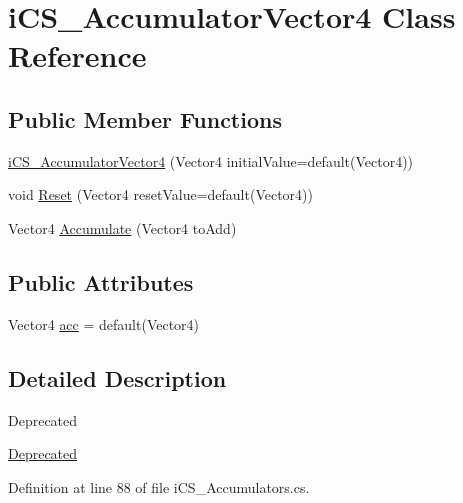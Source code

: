 \hypertarget{classi_c_s___accumulator_vector4}{\section{i\+C\+S\+\_\+\+Accumulator\+Vector4 Class Reference}
\label{classi_c_s___accumulator_vector4}
}
\subsection*{Public Member Functions}
\begin{DoxyCompactItemize}
\item 
\hyperlink{classi_c_s___accumulator_vector4_a559f3ed2688c8e9bc8d5309dd44620fa}{i\+C\+S\+\_\+\+Accumulator\+Vector4} (Vector4 initial\+Value=default(Vector4))
\item 
void \hyperlink{classi_c_s___accumulator_vector4_a2785737de517b3c0f739309e5217dd4d}{Reset} (Vector4 reset\+Value=default(Vector4))
\item 
Vector4 \hyperlink{classi_c_s___accumulator_vector4_a0f8be07a41d8e06c8a88d15c747524ad}{Accumulate} (Vector4 to\+Add)
\end{DoxyCompactItemize}
\subsection*{Public Attributes}
\begin{DoxyCompactItemize}
\item 
Vector4 \hyperlink{classi_c_s___accumulator_vector4_a9f29e0408689d6ca890d395d5494a16a}{acc} = default(Vector4)
\end{DoxyCompactItemize}


\subsection{Detailed Description}
\begin{DoxyRefDesc}{Deprecated}
\item[\hyperlink{deprecated__deprecated000005}{Deprecated}]\end{DoxyRefDesc}


Definition at line 88 of file i\+C\+S\+\_\+\+Accumulators.\+cs.



